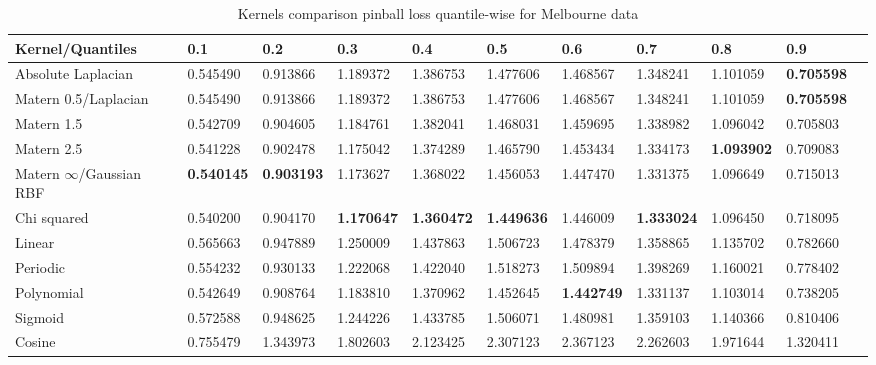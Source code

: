 \begin{table}[!h]
    \caption{Kernels comparison pinball loss quantile-wise for Melbourne data}
    \label{tab:kernel pinball comparison quantile-wise}
    \begin{adjustbox}{width=\textwidth}
    \begin{tabular}{lllllllllll}
    \toprule
    Kernel/Quantiles & 0.1 & 0.2 & 0.3 & 0.4 & 0.5 & 0.6 & 0.7 & 0.8 & 0.9 \\
    \midrule
    Absolute Laplacian & 0.545490 &
    0.913866 &
    1.189372 &
    1.386753 &
    1.477606 &
    1.468567 &
    1.348241 &
    1.101059 &
    \textbf{0.705598} &
    \\
    Matern 0.5/Laplacian & 0.545490 &
    0.913866 &
    1.189372 &
    1.386753 &
    1.477606 &
    1.468567 &
    1.348241 &
    1.101059 &
    \textbf{0.705598} &
\\
    Matern 1.5 & 0.542709 &
    0.904605 &
    1.184761 &
    1.382041 &
    1.468031 &
    1.459695 &
    1.338982 &
    1.096042 &
    0.705803 &
  \\  
    Matern 2.5 & 0.541228 &
    0.902478 &
    1.175042 &
    1.374289 &
    1.465790 &
    1.453434 &
    1.334173 &
    \textbf{1.093902} &
    0.709083 &
    \\
    Matern $\infty$/Gaussian RBF & \textbf{0.540145} &
    \textbf{0.903193} &
    1.173627 &
    1.368022 &
    1.456053 &
    1.447470 &
    1.331375 &
    1.096649 &
    0.715013 &    
    \\
    Chi squared & 0.540200 &
    0.904170 &
    \textbf{1.170647} &
    \textbf{1.360472} &
    \textbf{1.449636} &
    1.446009 &
    \textbf{1.333024} &
    1.096450 &
    0.718095 &
    \\
    Linear & 0.565663 &
    0.947889 &
    1.250009 &
    1.437863 &
    1.506723 &
    1.478379 &
    1.358865 &
    1.135702 &
    0.782660 &
    \\
    Periodic & 0.554232 &
    0.930133 &
    1.222068 &
    1.422040 &
    1.518273 &
    1.509894 &
    1.398269 &
    1.160021 &
    0.778402 &
    \\
    Polynomial & 0.542649 &
    0.908764 &
    1.183810 &
    1.370962 &
    1.452645 &
    \textbf{1.442749} &
    1.331137 &
    1.103014 &
    0.738205 &
    \\
    Sigmoid & 0.572588 &
    0.948625 &
    1.244226 &
    1.433785 &
    1.506071 &
    1.480981 &
    1.359103 &
    1.140366 &
    0.810406 &
    \\
    Cosine & 0.755479 &
    1.343973 &
    1.802603 &
    2.123425 &
    2.307123 &
    2.367123 &
    2.262603 &
    1.971644 &
    1.320411 \\
    \bottomrule
    \end{tabular}
    \end{adjustbox}
\end{table}


